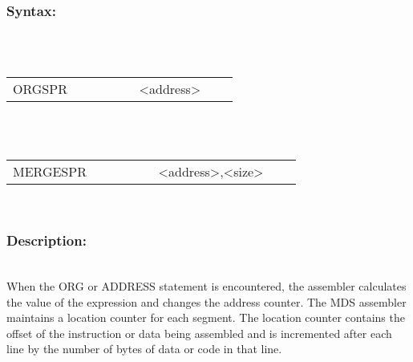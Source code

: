         \subsubsection{Syntax:}\\
        \\ {
                \texttt{}
                \begin{tabular}[h!]{llll}
                        { \color{highlight_directive} ORGSPR } & \verb'         '
                        { \color{highlight_constant} <address> } & { \color{highlight_comment}  }\\
                \end{tabular}
            }\\
        \\ {
                \texttt{}
                \begin{tabular}[h!]{llll}
                        { \color{highlight_directive} MERGESPR } & \verb'         '
                        { \color{highlight_constant} <address>,<size> } & { \color{highlight_comment}  }\\
                \end{tabular}
            }\\
        \subsubsection{Description:}\\
        When the ORG or ADDRESS statement is encountered, the assembler calculates the value of the expression and changes the address counter.
        The MDS assembler maintains a location counter for each segment. The location counter contains the offset of the instruction or data
        being assembled and is incremented after each line by the number of bytes of data or code in that line.
